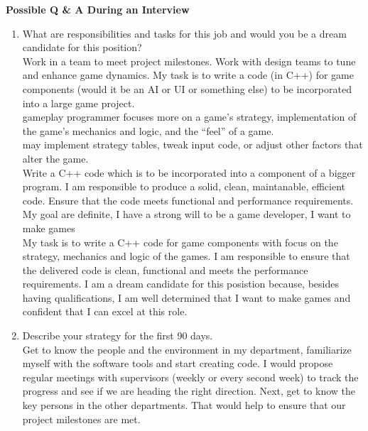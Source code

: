 \documentclass{article}
\begin{document}
\begin{center}
\Large{\bf{Possible Q \& A During an Interview}}
\end{center}

\begin{enumerate}

  \item What are responsibilities and tasks for this job and would you be a
    dream candidate for this position?\\
    Work in a team to meet project milestones.
    Work with design teams to tune and enhance game dynamics.
    My task is to write a code (in C++) for game components (would it be an AI
    or UI or something else) to be incorporated into a large game project.\\
    gameplay programmer focuses more on a game's strategy, implementation of
    the game's mechanics and logic, and the ``feel'' of a game.\\
    may implement strategy tables, tweak input code, or adjust other factors
    that alter the game.\\
    Write a C++ code which is to be incorporated into a component of a bigger
    program. I am responsible to produce a solid, clean, maintanable, efficient
    code. Ensure that the code meets functional and performance requirements.\\
    My goal are definite, I have a strong will to be a game developer, I want
    to make games\\

    My task is to write a C++ code for game components with focus on the
    strategy, mechanics and logic of the games. I am responsible to ensure that
    the delivered code is clean, functional and meets the performance
    requirements.
    I am a dream candidate for this posistion because, besides having
    qualifications, I am well determined that I want to make games and
    confident that I can excel at this role.

  \item Describe your strategy for the first 90 days.\\
    Get to know the people and the environment in my department, familiarize
    myself with the software tools and start creating code. I would propose
    regular  meetings with supervisors (weekly or every second week) to track
    the progress and see if we are heading the right direction. Next, get to
    know the key persons in the other departments. That would help to ensure
    that our project milestones are met.


\end{enumerate}
\end{document}
